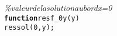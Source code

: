 {\begin{tabbing}
\textit{\%\phantom{x}valeur\phantom{x}de\phantom{x}la\phantom{x}solution\phantom{x}au\phantom{x}bord\phantom{x}x{=}0}\\
\texttt{\textbf{function}}\texttt{\phantom{x}res\phantom{x}{=}\phantom{x}f\_{}0y{(}y{)}}\\
\texttt{res\phantom{x}{=}\phantom{x}sol{(}0{,}y{)}{;}}
\end{tabbing}}